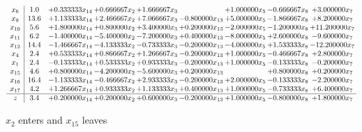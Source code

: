 \documentclass[10pt]{article}
\begin{document}
 \[\begin{array}{c| c c@{\hskip 2pt} c@{\hskip 2pt} c@{\hskip 2pt} c@{\hskip 2pt} c@{\hskip 2pt} c@{\hskip 2pt} c@{\hskip 2pt} }
 x_{6}   &  1.0 & + 0.333333 x_{14} & + 0.666667 x_{2} & + 1.666667 x_{3} &   & + 1.000000 x_{5} & -0.666667 x_{8} & + 3.000000 x_{7}\\
 x_{9}   &  13.6 & + 1.133333 x_{14} & + 2.466667 x_{2} & + 7.066667 x_{3} & -0.800000 x_{13} & + 5.000000 x_{5} & -1.866667 x_{8} & + 8.200000 x_{7}\\
 x_{10}   &  5.6 & + 1.800000 x_{14} & + 0.800000 x_{2} & + 3.400000 x_{3} & + 0.200000 x_{13} & -2.000000 x_{5} & -1.200000 x_{8} & + 11.200000 x_{7}\\
 x_{11}   &  6.2 & -1.400000 x_{14} & -5.400000 x_{2} & -7.200000 x_{3} & + 0.400000 x_{13} & -8.000000 x_{5} & + 2.600000 x_{8} & -9.600000 x_{7}\\
 x_{12}   &  14.4 & -1.466667 x_{14} & -4.133333 x_{2} & -0.733333 x_{3} & -0.200000 x_{13} & -4.000000 x_{5} & + 1.533333 x_{8} & -12.200000 x_{7}\\
 x_{4}   &  2.4 & + 0.533333 x_{14} & + 0.866667 x_{2} & + 1.266667 x_{3} & -0.200000 x_{13} & + 1.000000 x_{5} & -0.466667 x_{8} & + 2.800000 x_{7}\\
 x_{1}   &  2.4 & -0.133333 x_{14} & + 0.533333 x_{2} & + 0.933333 x_{3} & -0.200000 x_{13} & + 1.000000 x_{5} & -0.133333 x_{8} & -0.200000 x_{7}\\
 x_{15}   &  4.6 & + 0.800000 x_{14} & -4.200000 x_{2} & -5.600000 x_{3} & + 0.200000 x_{13} &   & + 0.800000 x_{8} & + 0.200000 x_{7}\\
 x_{16}   &  16.4 & -1.133333 x_{14} & -0.466667 x_{2} & + 2.933333 x_{3} & -0.200000 x_{13} & + 2.000000 x_{5} & -0.133333 x_{8} & -2.200000 x_{7}\\
 x_{17}   &  4.2 & + 1.266667 x_{14} & + 0.933333 x_{2} & + 1.133333 x_{3} & + 0.400000 x_{13} & + 1.000000 x_{5} & -0.733333 x_{8} & + 6.400000 x_{7}\\
\hline
z    &  3.4 & + 0.200000 x_{14} & + 0.200000 x_{2} & + 0.600000 x_{3} & -0.200000 x_{13} & + 1.000000 x_{5} & -0.800000 x_{8} & + 1.800000 x_{7}\\
\end{array}\]


 $ x_{2} $ enters and $ x_{15} $ leaves 
\end{document}
